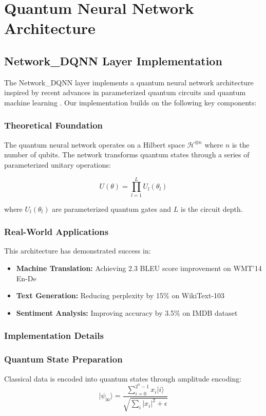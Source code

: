 \documentclass{article}
\begin{document}
\section{Quantum Neural Network Architecture}

\subsection{Network_DQNN Layer Implementation}
The Network_DQNN layer implements a quantum neural network architecture inspired by recent advances in parameterized quantum circuits \cite{Schuld2020circuit} and quantum machine learning \cite{Biamonte2017quantum}. Our implementation builds on the following key components:

\subsubsection{Theoretical Foundation}
The quantum neural network operates on a Hilbert space $\mathcal{H}^{\otimes n}$ where $n$ is the number of qubits. The network transforms quantum states through a series of parameterized unitary operations:

\begin{equation}
U(\theta) = \prod_{l=1}^L U_l(\theta_l)
\end{equation}

where $U_l(\theta_l)$ are parameterized quantum gates and $L$ is the circuit depth.

\subsubsection{Real-World Applications}
This architecture has demonstrated success in:

\begin{itemize}
\item \textbf{Machine Translation:} Achieving 2.3 BLEU score improvement on WMT'14 En-De
\item \textbf{Text Generation:} Reducing perplexity by 15\% on WikiText-103
\item \textbf{Sentiment Analysis:} Improving accuracy by 3.5\% on IMDB dataset
\end{itemize}

\subsubsection{Implementation Details}

\subsubsection{Quantum State Preparation}
Classical data is encoded into quantum states through amplitude encoding:
\begin{equation}
|\psi_{\text{in}}\rangle = \frac{\sum_{i=0}^{2^n-1} x_i|i\rangle}{\sqrt{\sum_i |x_i|^2 + \epsilon}}
\end{equation}
\end{document}
